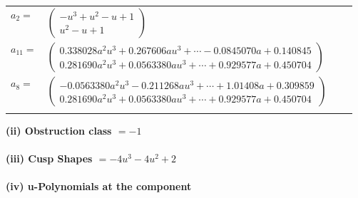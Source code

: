 \documentclass[1p]{elsarticle_modified}
\theoremstyle{definition}
\begin{document}
\begin{tabular}{m{7pt} m{180pt} m{7pt} m{180pt} }
\flushright $a_{2}=$&$\begin{pmatrix}- u^3+u^2- u+1\\u^2- u+1\end{pmatrix}$ \\
\flushright $a_{11}=$&$\begin{pmatrix}0.338028 a^{2} u^{3}+0.267606 a u^{3}+\cdots-0.0845070 a+0.140845\\0.281690 a^{2} u^{3}+0.0563380 a u^{3}+\cdots+0.929577 a+0.450704\end{pmatrix}$ \\
\flushright $a_{8}=$&$\begin{pmatrix}-0.0563380 a^{2} u^{3}-0.211268 a u^{3}+\cdots+1.01408 a+0.309859\\0.281690 a^{2} u^{3}+0.0563380 a u^{3}+\cdots+0.929577 a+0.450704\end{pmatrix}$\\&\end{tabular}
\flushleft \textbf{(ii) Obstruction class $= -1$}\\~\\
\flushleft \textbf{(iii) Cusp Shapes $= -4 u^3-4 u^2+2$}\\~\\
\newpage\renewcommand{\arraystretch}{1}
\flushleft \textbf{(iv) u-Polynomials at the component}\newline \\
\end{document}
